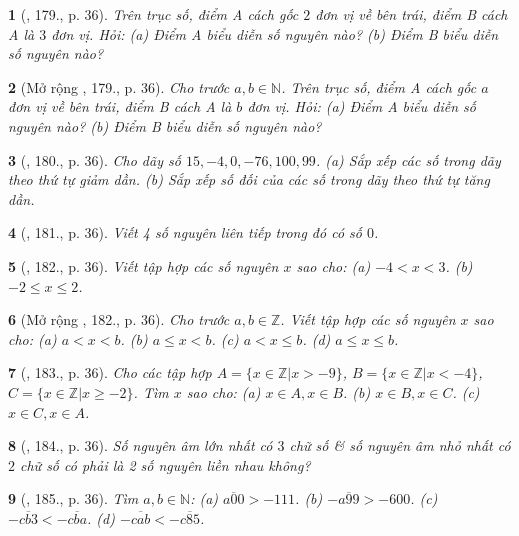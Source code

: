 \documentclass{article}
\newtheorem{baitoan}{}
\begin{document}
\begin{baitoan}[\cite{Tuyen_Toan_6}, 179., p. 36]
	Trên trục số, điểm A cách gốc $2$ đơn vị về bên trái, điểm B cách A là $3$ đơn vị. Hỏi: (a) Điểm A biểu diễn số nguyên nào? (b) Điểm B biểu diễn số nguyên nào?
\end{baitoan}

\begin{baitoan}[Mở rộng \cite{Tuyen_Toan_6}, 179., p. 36]
	Cho trước $a,b\in\mathbb{N}$. Trên trục số, điểm A cách gốc $a$ đơn vị về bên trái, điểm B cách A là $b$ đơn vị. Hỏi: (a) Điểm A biểu diễn số nguyên nào? (b) Điểm B biểu diễn số nguyên nào?
\end{baitoan}

\begin{baitoan}[\cite{Tuyen_Toan_6}, 180., p. 36]
	Cho dãy số $15,-4,0,-76,100,99$. (a) Sắp xếp các số trong dãy theo thứ tự giảm dần. (b) Sắp xếp số đối của các số trong dãy theo thứ tự tăng dần.
\end{baitoan}

\begin{baitoan}[\cite{Tuyen_Toan_6}, 181., p. 36]
	Viết 4 số nguyên liên tiếp trong đó có số $0$.
\end{baitoan}

\begin{baitoan}[\cite{Tuyen_Toan_6}, 182., p. 36]
	Viết tập hợp các số nguyên $x$ sao cho: (a) $-4 < x < 3$. (b) $-2\le x\le 2$.
\end{baitoan}

\begin{baitoan}[Mở rộng \cite{Tuyen_Toan_6}, 182., p. 36]
	Cho trước $a,b\in\mathbb{Z}$. Viết tập hợp các số nguyên $x$ sao cho: (a) $a < x < b$. (b) $a\le x < b$. (c) $a < x\le b$. (d) $a\le x\le b$.
\end{baitoan}

\begin{baitoan}[\cite{Tuyen_Toan_6}, 183., p. 36]
	Cho các tập hợp $A = \{x\in\mathbb{Z}|x > -9\}$, $B = \{x\in\mathbb{Z}|x < -4\}$, $C = \{x\in\mathbb{Z}|x\ge-2\}$. Tìm $x$ sao cho: (a) $x\in A,x\in B$. (b) $x\in B,x\in C$. (c) $x\in C,x\in A$.
\end{baitoan}

\begin{baitoan}[\cite{Tuyen_Toan_6}, 184., p. 36]
	Số nguyên âm lớn nhất có $3$ chữ số \& số nguyên âm nhỏ nhất có $2$ chữ số có phải là 2 số nguyên liền nhau không?
\end{baitoan}

\begin{baitoan}[\cite{Tuyen_Toan_6}, 185., p. 36]
	Tìm $a,b\in\mathbb{N}$: (a) $\overline{a00} > -111$. (b) $-\overline{a99} > -600$. (c) $-\overline{cb3} < -\overline{cba}$. (d) $-\overline{cab} < -\overline{c85}$.
\end{baitoan}
\end{document}
